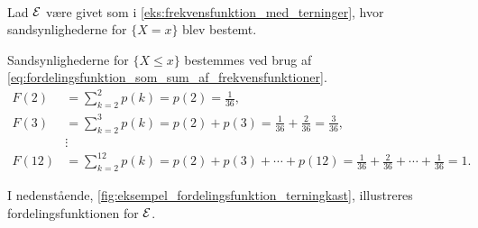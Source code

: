 \begin{eks}\textbf{}\label{eks:fordelingsfunktionen}\\
Lad $\mathcal{E}$ være givet som i \autoref{eks:frekvensfunktion_med_terninger}, hvor sandsynlighederne for $\{X=x\}$ blev bestemt.

Sandsynlighederne for $\{X\leq x\}$ bestemmes ved brug af \autoref{eq:fordelingsfunktion_som_sum_af_frekvensfunktioner}. 
\begin{align*}
    F(2)&=\sum_{k=2}^2 p(k)=p(2)=\frac{1}{36},\\
    F(3)&=\sum_{k=2}^3 p(k)=p(2)+p(3)=\frac{1}{36}+\frac{2}{36}=\frac{3}{36},\\
    &\vdots\\
    F(12)&=\sum_{k=2}^{12}p(k)=p(2)+p(3)+\cdots+ p(12)=\frac{1}{36}+\frac{2}{36}+\cdots+\frac{1}{36}=1.
\end{align*}

I nedenstående, \autoref{fig:eksempel_fordelingsfunktion_terningkast}, illustreres fordelingsfunktionen for $\mathcal{E}$. 









\end{eks}
